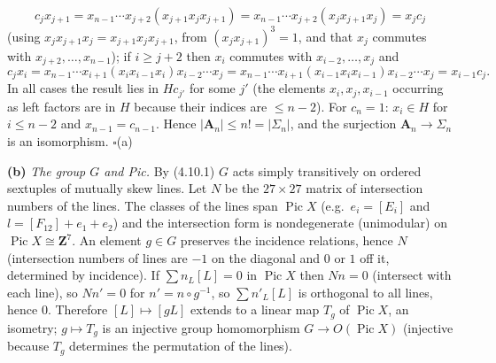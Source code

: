 \documentclass[11pt]{article}
\begin{document}
\[
c_jx_{j+1}=x_{n-1}\cdots x_{j+2}(x_{j+1}x_jx_{j+1})=x_{n-1}\cdots x_{j+2}(x_jx_{j+1}x_j)=x_jc_j
\]
(using $x_jx_{j+1}x_j=x_{j+1}x_jx_{j+1}$, from $(x_jx_{j+1})^3=1$, and that $x_j$ commutes with $x_{j+2},\dots,x_{n-1}$); if $i\ge j+2$ then $x_i$ commutes with $x_{i-2},\dots,x_j$ and
\[
c_jx_i=x_{n-1}\cdots x_{i+1}(x_ix_{i-1}x_i)x_{i-2}\cdots x_j=x_{n-1}\cdots x_{i+1}(x_{i-1}x_ix_{i-1})x_{i-2}\cdots x_j=x_{i-1}c_j .
\]
In all cases the result lies in $Hc_{j'}$ for some $j'$ (the elements $x_i,x_{j},x_{i-1}$ occurring as left factors are in $H$ because their indices are $\le n-2$). For $c_n=1$: $x_i\in H$ for $i\le n-2$ and $x_{n-1}=c_{n-1}$. Hence $|\mathbf A_n|\le n!=|\Sigma_n|$, and the surjection $\mathbf A_n\to\Sigma_n$ is an isomorphism. \hfill$\square$(a)

\textbf{(b)} \emph{The group $G$ and Pic.} By (4.10.1) $G$ acts simply transitively on ordered sextuples of mutually skew lines. Let $N$ be the $27\times27$ matrix of intersection numbers of the lines. The classes of the lines span $\operatorname{Pic}X$ (e.g.\ $e_i=[E_i]$ and $l=[F_{12}]+e_1+e_2$) and the intersection form is nondegenerate (unimodular) on $\operatorname{Pic}X\cong\mathbf Z^7$. An element $g\in G$ preserves the incidence relations, hence $N$ (intersection numbers of lines are $-1$ on the diagonal and $0$ or $1$ off it, determined by incidence). If $\sum n_L[L]=0$ in $\operatorname{Pic}X$ then $Nn=0$ (intersect with each line), so $Nn'=0$ for $n'=n\circ g^{-1}$, so $\sum n'_L[L]$ is orthogonal to all lines, hence $0$. Therefore $[L]\mapsto[gL]$ extends to a linear map $T_g$ of $\operatorname{Pic}X$, an isometry; $g\mapsto T_g$ is an injective group homomorphism $G\to O(\operatorname{Pic}X)$ (injective because $T_g$ determines the permutation of the lines).
\end{document}
